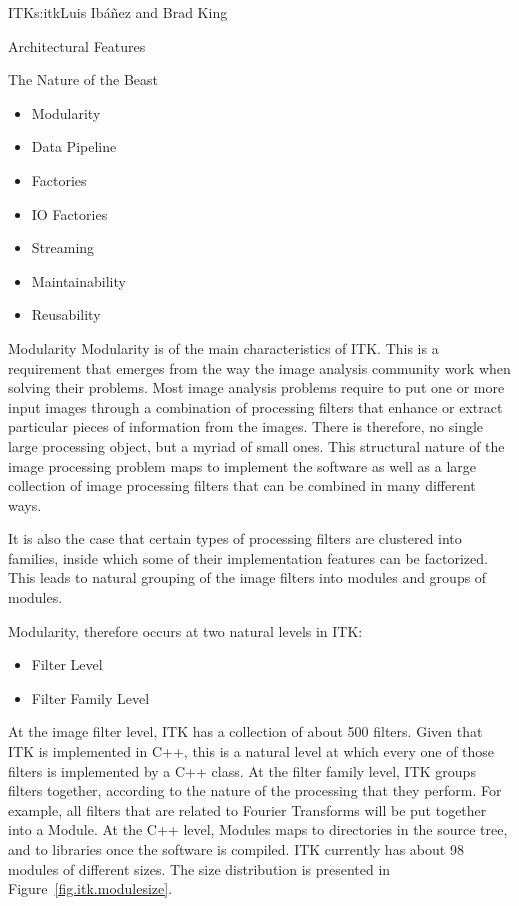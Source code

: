 \begin{aosachapter}{ITK}{s:itk}{Luis Ib\'{a}\~{n}ez and Brad King}
\begin{aosasect1}{Architectural Features}
\begin{aosasect2}{The Nature of the Beast}
\begin{itemize}
\item Modularity
\item Data Pipeline
\item Factories
\item IO Factories
\item Streaming
\item Maintainability
\item Reusability
\end{itemize}

\end{aosasect2}

\begin{aosasect2}{Modularity}
Modularity is of the main characteristics of ITK. This is a requirement that
emerges from the way the image analysis community work when solving their
problems. Most image analysis problems require to put one or more input images
through a combination of processing filters that enhance or extract particular
pieces of information from the images. There is therefore, no single large
processing object, but a myriad of small ones. This structural nature of the
image processing problem maps to implement the software as well as a large
collection of image processing filters that can be combined in many different
ways.

It is also the case that certain types of processing filters are clustered into
families, inside which some of their implementation features can be factorized.
This leads to natural grouping of the image filters into modules and groups of
modules.

Modularity, therefore occurs at two natural levels in ITK:

\begin{itemize}
\item Filter Level
\item Filter Family Level
\end{itemize}

At the image filter level, ITK has a collection of about 500 filters. Given
that ITK is implemented in C++, this is a natural level at which every one of
those filters is implemented by a C++ class.  At the filter family level, ITK
groups filters together, according to the nature of the processing that they
perform. For example, all filters that are related to Fourier Transforms will
be put together into a Module. At the C++ level, Modules maps to directories in
the source tree, and to libraries once the software is compiled. ITK currently
has about 98 modules of different sizes. The size distribution is presented in
Figure~\ref{fig.itk.modulesize}.


\end{aosasect2}
\end{aosasect1}
\end{aosachapter}
